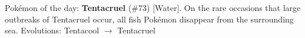 Pokémon of the day:
\textbf{Tentacruel} (\#73) [Water].
On the rare occasions that large outbreaks of Tentacruel occur, all fish Pok\'emon disappear from the surrounding sea.
Evolutions: Tentacool $\rightarrow$ Tentacruel